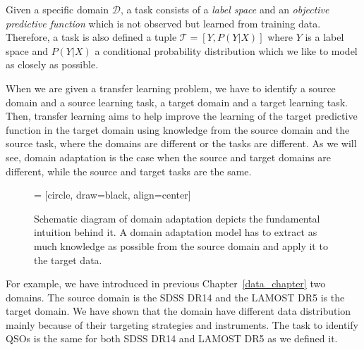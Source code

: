 Given a specific domain \(\mathcal{D}\),
a task consists of a \textit{label space} and an \textit{objective predictive function}
which is not observed but learned from training data.
Therefore, a task is also defined a tuple \(\mathcal{T} = [Y, P(Y | X)]\)
where \(Y\) is a label space
and \(P(Y | X)\) a conditional probability distribution
which we like to model as closely as possible.

When we are given a transfer learning problem,
we have to identify a source domain and a source learning task,
a target domain and a target learning task.
Then, transfer learning aims to help improve the learning of the target predictive function in the target domain
using knowledge from the source domain and the source task,
where the domains are different or the tasks are different.
As we will see, domain adaptation is the case
when the source and target domains are different,
while the source and target tasks are the same.~\cite{pan2010}

\begin{figure}
\begin{center}
 = [circle, draw=black, align=center]
\end{center}
\caption[Schematic depiction of domain adaptation]{
	Schematic diagram of domain adaptation depicts the fundamental intuition behind it.
	A domain adaptation model has to extract as much knowledge as possible from the source domain
	and apply it to the target data.
	}
\end{figure}

For example, we have introduced in previous Chapter~\ref{data_chapter}
two domains.
The source domain is the SDSS DR14 and the LAMOST DR5 is the target domain.
We have shown that the domain have different data distribution
mainly because of their targeting strategies and instruments.
The task to identify QSOs is the same for both SDSS DR14 and LAMOST DR5
as we defined it.

